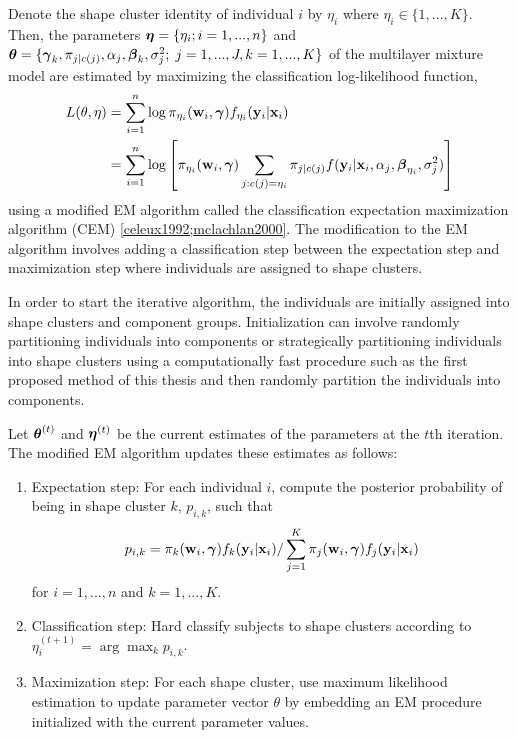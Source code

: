 Denote the shape cluster identity of individual $i$ by $\eta_{i}$ where $\eta_{i}\in\{1,...,K\}$. Then, the parameters $\boldsymbol\eta = \{\eta_{i}; i=1,...,n\}$ and $\boldsymbol\theta=\{\boldsymbol \gamma_{k}, \pi_{j|c(j)},\alpha_{j}, \boldsymbol\beta_{k},\sigma^{2}_{j};\; j=1,...,J, k=1,...,K\}$ of the multilayer mixture model are estimated by maximizing the classification log-likelihood function,
\begin{align}
 L(\theta,\eta) &= \sum^{n}_{i=1} \log \pi_{\eta_{i}}(\mathbf w_{i},\boldsymbol\gamma) f_{\eta_{i}}(\mathbf y_{i}|\mathbf x_{i})\\
\label{ll}& =  \sum^{n}_{i=1} \log\left[ \pi_{\eta_{i}}(\mathbf w_{i},\boldsymbol\gamma)  \sum_{j: c(j) = \eta_{i}} \pi_{j|c(j)}f(\mathbf y_{i}|\mathbf x_{i},\alpha_{j},\boldsymbol\beta_{\eta_{i}},\sigma^{2}_{j})\right]
\end{align} 
using a modified EM algorithm called the classification expectation maximization algorithm (CEM) \ref{celeux1992;mclachlan2000}. The modification to the EM algorithm involves adding a classification step between the expectation step and maximization step where individuals are assigned to shape clusters. 

In order to start the iterative algorithm, the individuals are initially assigned into shape clusters and component groups. Initialization can involve randomly partitioning individuals into components or strategically partitioning individuals into shape clusters using a computationally fast procedure such as the first proposed method of this thesis and then randomly partition the individuals into components. 

Let $\boldsymbol\theta^{(t)}$ and $\boldsymbol\eta^{(t)}$ be the current estimates of the parameters at the $t$th iteration. The modified EM algorithm updates these estimates as follows:
\begin{enumerate}
\item Expectation step: For each individual $i$, compute the posterior probability of being in shape cluster $k$, $p_{i,k}$, such that
$$p_{i,k}= \pi_{k}(\mathbf w_{i},\boldsymbol\gamma)f_{k}(\mathbf y_{i}|\mathbf x_{i})/\sum^{K}_{j=1} \pi_{j}(\mathbf w_{i},\boldsymbol\gamma)f_{j}(\mathbf y_{i}|\mathbf x_{i})$$
for $i=1,...,n$ and $k=1,...,K$.
\item Classification step: Hard classify subjects to shape clusters according to $\eta^{(t+1)}_{i} = \arg\max_{k} p_{i,k}$.
\item Maximization step: For each shape cluster, use maximum likelihood estimation to update parameter vector $\theta$ by embedding an EM procedure initialized with the current parameter values.
\end{enumerate} 

